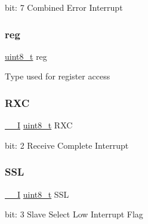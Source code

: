 bit\+: 7 Combined Error Interrupt \mbox{\label{union_s_e_r_c_o_m___s_p_i___i_n_t_f_l_a_g___type_a9428adc9af4653a2050e2536b55dec8d}} 
\subsubsection{\texorpdfstring{reg}{reg}}
{\footnotesize\ttfamily \mbox{\hyperlink{union_s_e_r_c_o_m___s_p_i___i_n_t_f_l_a_g___type_a5b4208c6f4c4a4290c4f2804d1eb1d5b}{uint8\+\_\+t}} reg}

Type used for register access \mbox{\label{union_s_e_r_c_o_m___s_p_i___i_n_t_f_l_a_g___type_a6a70680cf18df53069f66ae6df6506ff}} 
\subsubsection{\texorpdfstring{RXC}{RXC}}
{\footnotesize\ttfamily \mbox{\hyperlink{core__cm0plus_8h_af63697ed9952cc71e1225efe205f6cd3}{\+\_\+\+\_\+I}} \mbox{\hyperlink{union_s_e_r_c_o_m___s_p_i___i_n_t_f_l_a_g___type_a5b4208c6f4c4a4290c4f2804d1eb1d5b}{uint8\+\_\+t}} R\+XC}

bit\+: 2 Receive Complete Interrupt \mbox{\label{union_s_e_r_c_o_m___s_p_i___i_n_t_f_l_a_g___type_accf7afb198b7a82968ea98c8ce8f72df}} 
\subsubsection{\texorpdfstring{SSL}{SSL}}
{\footnotesize\ttfamily \mbox{\hyperlink{core__cm0plus_8h_af63697ed9952cc71e1225efe205f6cd3}{\+\_\+\+\_\+I}} \mbox{\hyperlink{union_s_e_r_c_o_m___s_p_i___i_n_t_f_l_a_g___type_a5b4208c6f4c4a4290c4f2804d1eb1d5b}{uint8\+\_\+t}} S\+SL}

bit\+: 3 Slave Select Low Interrupt Flag \mbox{\label{union_s_e_r_c_o_m___s_p_i___i_n_t_f_l_a_g___type_a79c6db23e2db2b1ff2aded896a392fb3}} 
